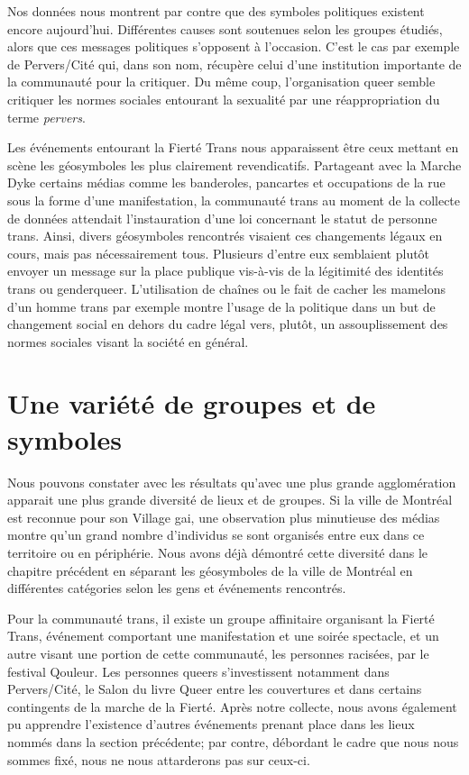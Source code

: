 Nos données nous montrent par contre que des symboles politiques existent encore aujourd'hui.
Différentes causes sont soutenues selon les groupes étudiés, alors que ces messages politiques s'opposent à l'occasion.
C'est le cas par exemple de Pervers/Cité qui, dans son nom, récupère celui d'une institution importante de la communauté \lgbt{} pour la critiquer.
Du même coup, l'organisation queer semble critiquer les normes sociales entourant la sexualité par une réappropriation du terme \emph{pervers}. 

Les événements entourant la Fierté Trans nous apparaissent être ceux mettant en scène les géosymboles les plus clairement revendicatifs.
Partageant avec la Marche Dyke certains médias comme les banderoles, pancartes et occupations de la rue sous la forme d'une manifestation, la communauté trans au moment de la collecte de données attendait l'instauration d'une loi concernant le statut de personne trans.
Ainsi, divers géosymboles rencontrés visaient ces changements légaux en cours, mais pas nécessairement tous.
Plusieurs d'entre eux semblaient plutôt envoyer un message sur la place publique vis-à-vis de la légitimité des identités trans ou genderqueer.
L'utilisation de chaînes ou le fait de cacher les mamelons d'un homme trans par exemple montre l'usage de la politique dans un but de changement social en dehors du cadre légal vers, plutôt, un assouplissement des normes sociales visant la société en général.

\section{Une variété de groupes et de symboles}
\label{sec:une_variete_de_groupes_et_de_symboles}
Nous pouvons constater avec les résultats qu'avec une plus grande agglomération apparait une plus grande diversité de lieux et de groupes.
Si la ville de Montréal est reconnue pour son Village gai, une observation plus minutieuse des médias \lgbt montre qu'un grand nombre d'individus se sont organisés entre eux dans ce territoire ou en périphérie.
Nous avons déjà démontré cette diversité dans le chapitre précédent en séparant les géosymboles de la ville de Montréal en différentes catégories selon les gens et événements rencontrés.

Pour la communauté trans, il existe un groupe affinitaire organisant la Fierté Trans, événement comportant une manifestation et une soirée spectacle, et un autre visant une portion de cette communauté, les personnes racisées, par le festival Qouleur.
Les personnes queers s'investissent notamment dans Pervers/Cité, le Salon du livre Queer entre les couvertures et dans certains contingents de la marche de la Fierté. 
Après notre collecte, nous avons également pu apprendre l'existence d'autres événements prenant place dans les lieux nommés dans la section précédente; par contre, débordant le cadre que nous nous sommes fixé, nous ne nous attarderons pas sur ceux-ci.

